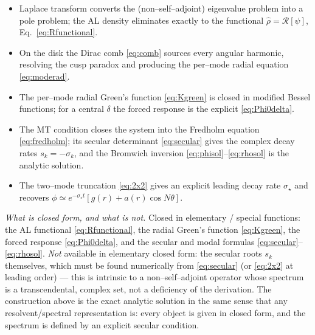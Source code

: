 \documentclass{article}
\begin{document}
\begin{itemize}
\item Laplace transform converts the (non--self--adjoint) eigenvalue problem into
a pole problem; the AL density eliminates exactly to the functional
$\widehat\rho=\mathcal R[\psi]$, Eq.~\eqref{eq:Rfunctional}.
\item On the disk the Dirac comb \eqref{eq:comb} sources every angular harmonic,
resolving the cusp paradox and producing the per--mode radial equation
\eqref{eq:moderad}.
\item The per--mode radial Green's function \eqref{eq:Kgreen} is closed in
modified Bessel functions; for a central $\delta$ the forced response is the
explicit \eqref{eq:Phi0delta}.
\item The MT condition closes the system into the Fredholm equation
\eqref{eq:fredholm}; its secular determinant \eqref{eq:secular} gives the
complex decay rates $s_k=-\sigma_k$, and the Bromwich inversion
\eqref{eq:phisol}--\eqref{eq:rhosol} is the analytic solution.
\item The two--mode truncation \eqref{eq:2x2} gives an explicit leading decay
rate $\sigma_\star$ and recovers $\phi\simeq e^{-\sigma_\star t}[g(r)+a(r)\cos
N\theta]$.
\end{itemize}

\noindent\textit{What is closed form, and what is not.} Closed in elementary /
special functions: the AL functional \eqref{eq:Rfunctional}, the radial Green's
function \eqref{eq:Kgreen}, the forced response \eqref{eq:Phi0delta}, and the
secular and modal formulas \eqref{eq:secular}--\eqref{eq:rhosol}. \emph{Not}
available in elementary closed form: the secular roots $s_k$ themselves, which
must be found numerically from \eqref{eq:secular} (or \eqref{eq:2x2} at leading
order) --- this is intrinsic to a non--self--adjoint operator whose spectrum is a
transcendental, complex set, not a deficiency of the derivation. The construction
above is the exact analytic solution in the same sense that any
resolvent/spectral representation is: every object is given in closed form, and
the spectrum is defined by an explicit secular condition.
\end{document}
